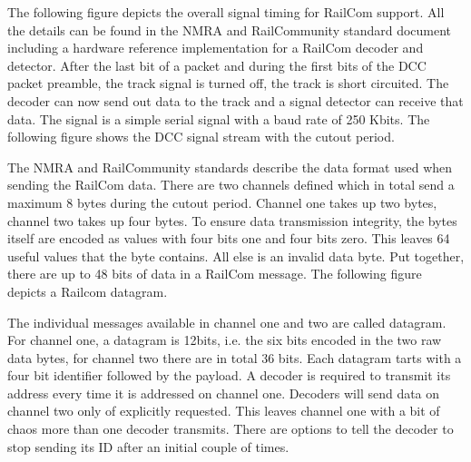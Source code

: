The following figure depicts the overall signal timing for RailCom support. All the details can be found in the NMRA and RailCommunity standard document including a hardware reference implementation for a RailCom decoder and detector. After the last bit of a packet and during the first bits of the DCC packet preamble, the track signal is turned off, the track is short circuited. The decoder can now send out data to the track and a signal detector can receive that data. The signal is a simple serial signal with a baud rate of 250 Kbits. The following figure shows the DCC signal stream with the cutout period.

\begin{center}
\end{center}

The NMRA and RailCommunity standards describe the data format used when sending the RailCom data. There are two channels defined which in total send a maximum 8 bytes during the cutout period. Channel one takes up two bytes, channel two takes up four bytes. To ensure data transmission integrity, the bytes itself are encoded as values with four bits one and four bits zero. This leaves 64 useful values that the byte contains. All else is an invalid data byte. Put together, there are up to 48 bits of data in a RailCom message. The following figure depicts a Railcom datagram.

\begin{center}
\end{center}

The individual messages available in channel one and two are called datagram. For channel one, a datagram is 12bits, i.e. the six bits encoded in the two raw data bytes, for channel two there are in total 36 bits. Each datagram tarts with a four bit identifier followed by the payload. A decoder is required to transmit its address every time it is addressed on channel one. Decoders will send data on channel two only of explicitly requested. This leaves channel one with a bit of chaos more than one decoder transmits. There are options to tell the decoder to stop sending its ID after an initial couple of times.

